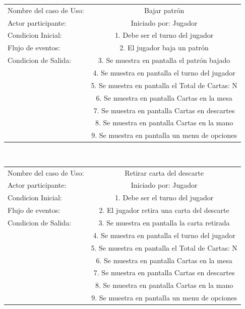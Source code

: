\documentclass[60pt]{article}
\begin{document}
\begin{center}
    \begin{tabular}{ l | c  }
        Nombre del caso de Uso: & Bajar \Gls{patrón} \\
        Actor participante: & Iniciado por: Jugador \\\hline
        Condicion Inicial: & 1. Debe ser el turno del jugador    \\
        Flujo de eventos: & 2. El jugador baja un \gls{patrón} \\\hline
        Condicion de Salida: & 3. Se muestra en pantalla el \gls{patrón} bajado \\
        & 4. Se muestra en pantalla el turno del jugador \\
        & 5. Se muestra en pantalla el Total de Cartas: N \\
        & 6. Se muestra en pantalla Cartas en la mesa \\
        & 7. Se muestra en pantalla Cartas en descartes \\
        & 8. Se muestra en pantalla Cartas en la mano \\
        & 9. Se muestra en pantalla un menu de opciones \\ 
    \end{tabular} \\
\end{center}
\begin{center}
    \begin{tabular}{ l | c  }
        Nombre del caso de Uso: & Retirar carta del descarte \\
        Actor participante: & Iniciado por: Jugador \\\hline
        Condicion Inicial: & 1. Debe ser el turno del jugador    \\
        Flujo de eventos: & 2. El jugador retira una carta del descarte \\\hline
        Condicion de Salida: & 3. Se muestra en pantalla la carta retirada \\
        & 4. Se muestra en pantalla el turno del jugador \\
        & 5. Se muestra en pantalla el Total de Cartas: N \\
        & 6. Se muestra en pantalla Cartas en la mesa \\
        & 7. Se muestra en pantalla Cartas en descartes \\
        & 8. Se muestra en pantalla Cartas en la mano \\
        & 9. Se muestra en pantalla un menu de opciones \\ 
    \end{tabular} \\
\end{center}
\clearpage
\end{document}
